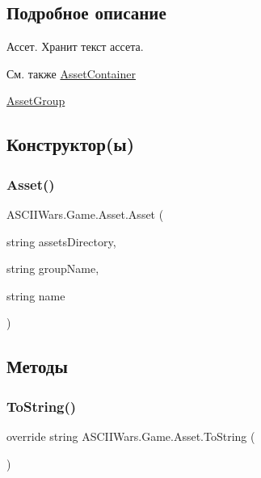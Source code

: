 \subsection{Подробное описание}
Ассет. Хранит текст ассета. 

\begin{DoxySeeAlso}{См. также}
\hyperlink{class_a_s_c_i_i_wars_1_1_game_1_1_asset_container}{Asset\+Container} 

\hyperlink{class_a_s_c_i_i_wars_1_1_game_1_1_asset_group}{Asset\+Group} 
\end{DoxySeeAlso}


\subsection{Конструктор(ы)}
\hypertarget{class_a_s_c_i_i_wars_1_1_game_1_1_asset_ab587d66e5e4257ab6baa804b00f2b112}{}\label{class_a_s_c_i_i_wars_1_1_game_1_1_asset_ab587d66e5e4257ab6baa804b00f2b112} 
\subsubsection{\texorpdfstring{Asset()}{Asset()}}
{\footnotesize\ttfamily A\+S\+C\+I\+I\+Wars.\+Game.\+Asset.\+Asset (\begin{DoxyParamCaption}\item[{string}]{assets\+Directory,  }\item[{string}]{group\+Name,  }\item[{string}]{name }\end{DoxyParamCaption})\hspace{0.3cm}{\ttfamily [inline]}}



\subsection{Методы}
\hypertarget{class_a_s_c_i_i_wars_1_1_game_1_1_asset_aaf8fcd0eea1ca1b6a5cd26be7ee8c24c}{}\label{class_a_s_c_i_i_wars_1_1_game_1_1_asset_aaf8fcd0eea1ca1b6a5cd26be7ee8c24c} 
\subsubsection{\texorpdfstring{To\+String()}{ToString()}}
{\footnotesize\ttfamily override string A\+S\+C\+I\+I\+Wars.\+Game.\+Asset.\+To\+String (\begin{DoxyParamCaption}{ }\end{DoxyParamCaption})\hspace{0.3cm}{\ttfamily [inline]}}



